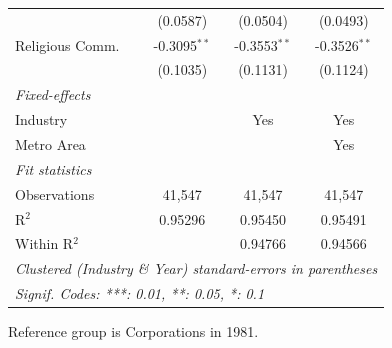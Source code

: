 \documentclass[
  12pt]{article}
\theoremstyle{definition}
\theoremstyle{remark}
\begin{document}
\begin{table}
\begin{minipage}{\linewidth}
\begin{tabular}{lccc}
                     & (0.0587)       & (0.0504)       & (0.0493)\\   
   Religious Comm.   & -0.3095$^{**}$ & -0.3553$^{**}$ & -0.3526$^{**}$\\   
                     & (0.1035)       & (0.1131)       & (0.1124)\\   
   \midrule
   \emph{Fixed-effects}\\
   Industry          &                & Yes            & Yes\\  
   Metro Area        &                &                & Yes\\  
   \midrule
   \emph{Fit statistics}\\
   Observations      & 41,547         & 41,547         & 41,547\\  
   R$^2$             & 0.95296        & 0.95450        & 0.95491\\  
   Within R$^2$      &                & 0.94766        & 0.94566\\  
   \midrule \midrule
   \multicolumn{4}{l}{\emph{Clustered (Industry \& Year) standard-errors in parentheses}}\\
   \multicolumn{4}{l}{\emph{Signif. Codes: ***: 0.01, **: 0.05, *: 0.1}}\\
\end{tabular}

\end{minipage}%
\newline
\begin{minipage}{\linewidth}

\par \raggedright

\end{minipage}%
\newline
\begin{minipage}{\linewidth}

Reference group is Corporations in 1981.

\end{minipage}%
\newline
\begin{minipage}{\linewidth}

\par\endgroup

\end{minipage}%

\end{table}%
\end{document}
